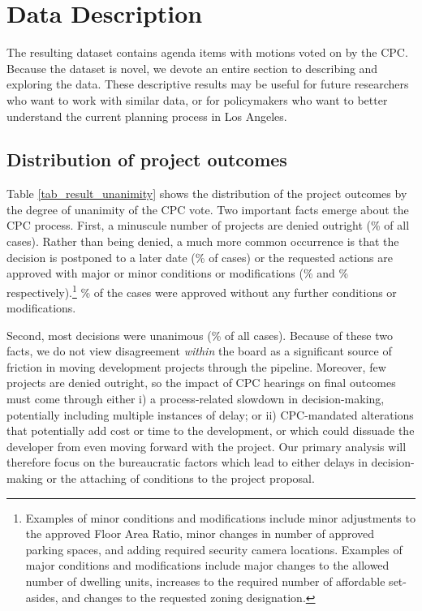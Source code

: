\section{Data Description} \label{sec_descriptives}

The resulting dataset contains  agenda items with motions voted on by the CPC. Because the dataset is novel, we devote an entire section to describing and exploring the data. These descriptive results may be useful for future researchers who want to work with similar data, or for policymakers who want to better understand the current planning process in Los Angeles.

\subsection{Distribution of project outcomes}

Table \ref{tab_result_unanimity} shows the distribution of the project outcomes by the degree of unanimity of the CPC vote. Two important facts emerge about the CPC process. First, a minuscule number of projects are denied outright (\% of all cases). Rather than being denied, a much more common occurrence is that the decision is postponed to a later date (\% of cases) or the requested actions are approved with major or minor conditions or modifications  (\% and \% respectively).\footnote{Examples of minor conditions and modifications include minor adjustments to the approved Floor Area Ratio, minor changes in number of approved parking spaces, and adding required security camera locations. Examples of major conditions and modifications include major changes to the allowed number of dwelling units, increases to the required number of affordable set-asides, and changes to the requested zoning designation.} \% of the cases were approved without any further conditions or modifications. 

Second, most decisions were unanimous (\% of all cases). Because of these two facts, we do not view disagreement \emph{within} the board as a significant source of friction in moving development projects through the pipeline. Moreover, few projects are denied outright, so the impact of CPC hearings on final outcomes must come through either i) a process-related slowdown in decision-making, potentially including multiple instances of delay; or ii) CPC-mandated alterations that potentially add cost or time to the development, or which could dissuade the developer from even moving forward with the project. Our primary analysis will therefore focus on the bureaucratic factors which lead to either delays in decision-making or the attaching of conditions to the project proposal.

